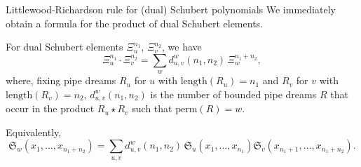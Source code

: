 \documentclass[aspectratio=169]{beamer}
\newcommand{\coma}{\mathbf{S}}
\newcommand{\dcoma}{\mathcal{DS}}
\newcommand{\Sch}[1]{\Xi_{#1}}
\newcommand{\sch}{\mathfrak{S}}
\newcommand{\RC}{\mathrm{Pipe}}
\newcommand{\hr}{\mathrm{length}}
\begin{document}


\begin{frame}{Littlewood-Richardson rule for (dual) Schubert polynomials}
We immediately obtain a formula for the product of dual Schubert elements.

\begin{theorem}[S, 2026+]
For dual Schubert elements $\Sch{u}^{n_1}$, $\Sch{v}^{n_2}$, we have
\[
\Sch{u}^{n_1}\cdot \Sch{v}^{n_2}
=
\sum_{w} d_{u,v}^{w}(n_1, n_2)\,\Sch{w}^{n_1 + n_2},
\]
where, fixing pipe dreams $R_u$ for $u$ with $\hr(R_u) = n_1$ and $R_v$ for $v$ with $\hr(R_v) = n_2$, $d_{u,v}^{w}(n_1, n_2)$ is the number of bounded pipe dreams $R$ that occur in the product $R_u\star R_v$ such that $\mathrm{perm}(R) = w$.

Equivalently,
$$\sch_w(x_1,\ldots,x_{n_1+n_2}) = \sum_{u,v} d_{u,v}^{w}(n_1, n_2)\,\sch_u(x_1,\ldots,x_{n_1})\sch_v(x_{n_1+1},\ldots,x_{n_1+n_2}).$$
\end{theorem}

\end{frame}
\end{document}
